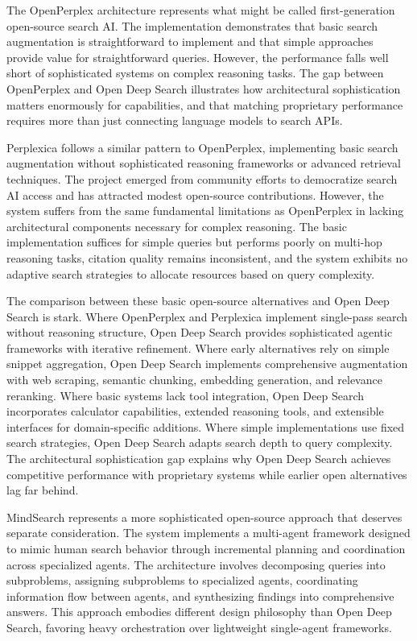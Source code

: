 The OpenPerplex architecture represents what might be called first-generation open-source search AI. The implementation demonstrates that basic search augmentation is straightforward to implement and that simple approaches provide value for straightforward queries. However, the performance falls well short of sophisticated systems on complex reasoning tasks. The gap between OpenPerplex and Open Deep Search illustrates how architectural sophistication matters enormously for capabilities, and that matching proprietary performance requires more than just connecting language models to search APIs.

Perplexica follows a similar pattern to OpenPerplex, implementing basic search augmentation without sophisticated reasoning frameworks or advanced retrieval techniques. The project emerged from community efforts to democratize search AI access and has attracted modest open-source contributions. However, the system suffers from the same fundamental limitations as OpenPerplex in lacking architectural components necessary for complex reasoning. The basic implementation suffices for simple queries but performs poorly on multi-hop reasoning tasks, citation quality remains inconsistent, and the system exhibits no adaptive search strategies to allocate resources based on query complexity.

The comparison between these basic open-source alternatives and Open Deep Search is stark. Where OpenPerplex and Perplexica implement single-pass search without reasoning structure, Open Deep Search provides sophisticated agentic frameworks with iterative refinement. Where early alternatives rely on simple snippet aggregation, Open Deep Search implements comprehensive augmentation with web scraping, semantic chunking, embedding generation, and relevance reranking. Where basic systems lack tool integration, Open Deep Search incorporates calculator capabilities, extended reasoning tools, and extensible interfaces for domain-specific additions. Where simple implementations use fixed search strategies, Open Deep Search adapts search depth to query complexity. The architectural sophistication gap explains why Open Deep Search achieves competitive performance with proprietary systems while earlier open alternatives lag far behind.

MindSearch represents a more sophisticated open-source approach that deserves separate consideration. The system implements a multi-agent framework designed to mimic human search behavior through incremental planning and coordination across specialized agents. The architecture involves decomposing queries into subproblems, assigning subproblems to specialized agents, coordinating information flow between agents, and synthesizing findings into comprehensive answers. This approach embodies different design philosophy than Open Deep Search, favoring heavy orchestration over lightweight single-agent frameworks.

